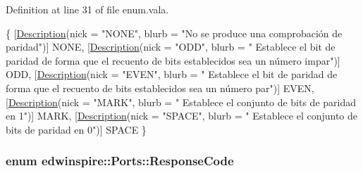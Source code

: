 Definition at line 31 of file enum.\-vala.


\begin{DoxyCode}
                           \{
                        [\hyperlink{namespaceedwinspire_1_1_ports_a3b5ab9c73da132e47d164f322cf54904}{Description}(nick = \textcolor{stringliteral}{"NONE"}, blurb = \textcolor{stringliteral}{"No se
       produce una comprobación de paridad"})]
                        NONE,  
                        [\hyperlink{namespaceedwinspire_1_1_ports_a3b5ab9c73da132e47d164f322cf54904}{Description}(nick = \textcolor{stringliteral}{"ODD"}, blurb = \textcolor{stringliteral}{"
      Establece el bit de paridad de forma que el recuento de bits establecidos sea un número
       impar"})]
                        ODD,  
                        [\hyperlink{namespaceedwinspire_1_1_ports_a3b5ab9c73da132e47d164f322cf54904}{Description}(nick = \textcolor{stringliteral}{"EVEN"}, blurb = \textcolor{stringliteral}{"
      Establece el bit de paridad de forma que el recuento de bits establecidos sea un número
       par"})]
                        EVEN,  
                        [\hyperlink{namespaceedwinspire_1_1_ports_a3b5ab9c73da132e47d164f322cf54904}{Description}(nick = \textcolor{stringliteral}{"MARK"}, blurb = \textcolor{stringliteral}{"
      Establece el conjunto de bits de paridad en 1"})]
                        MARK,  
                        [\hyperlink{namespaceedwinspire_1_1_ports_a3b5ab9c73da132e47d164f322cf54904}{Description}(nick = \textcolor{stringliteral}{"SPACE"}, blurb = \textcolor{stringliteral}{"
      Establece el conjunto de bits de paridad en 0"})]
                        SPACE  
                \}               
\end{DoxyCode}
\hypertarget{namespaceedwinspire_1_1_ports_ac176c111882ba8478fef22b8f15a22b5}{
\subsubsection[{Response\-Code}]{\setlength{\rightskip}{0pt plus 5cm}enum {\bf edwinspire\-::\-Ports\-::\-Response\-Code}}}\label{namespaceedwinspire_1_1_ports_ac176c111882ba8478fef22b8f15a22b5}
